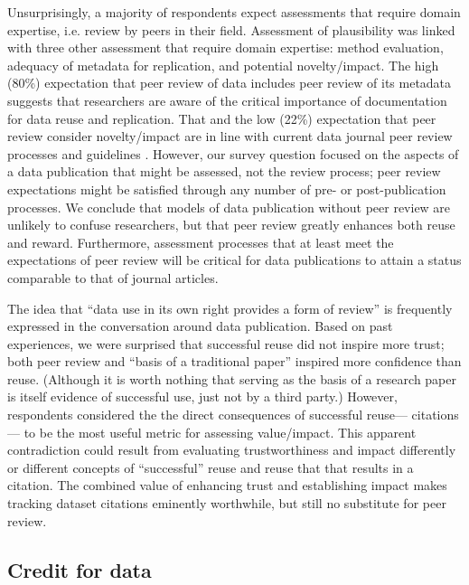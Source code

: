 \documentclass[10pt]{article}
\begin{document}
Unsurprisingly, a majority of respondents expect assessments that require domain expertise, i.e. review by peers in their field.
Assessment of plausibility was linked with three other assessment that require domain expertise: method evaluation, adequacy of metadata for replication, and potential novelty/impact.
The high (80\%) expectation that peer review of data includes peer review of its metadata suggests that researchers are aware of the critical importance of documentation for data reuse and replication.
That and the low (22\%) expectation that peer review consider novelty/impact are in line with current data journal peer review processes and guidelines \cite{kratz_data_2014}.
However, our survey question focused on the aspects of a data publication that might be assessed, not the review process; peer review expectations might be satisfied through any number of pre- or post-publication processes.
We conclude that models of data publication without peer review are unlikely to confuse researchers, but that peer review greatly enhances both reuse and reward.
Furthermore, assessment processes that at least meet the expectations of peer review will be critical for data publications to attain a status comparable to that of journal articles.

The idea that ``data use in its own right provides a form of review'' \cite{parsons_data_2010} is frequently expressed in the conversation around data publication. 
Based on past experiences, we were surprised that successful reuse did not inspire more trust; both peer review and ``basis of a traditional paper'' inspired more confidence than reuse.
(Although it is worth nothing that serving as the basis of a research paper is itself evidence of successful use, just not by a third party.)
However, respondents considered the the direct consequences of successful reuse--- citations--- to be the most useful metric for assessing value/impact.
This apparent contradiction could result from evaluating trustworthiness and impact differently or different concepts of  ``successful'' reuse and reuse that that results in a citation.
The combined value of enhancing trust and establishing impact makes tracking dataset citations eminently worthwhile, but still no substitute for peer review.

\subsection*{Credit for data}
\end{document}
